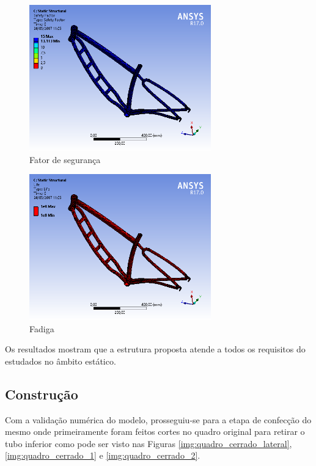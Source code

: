 	\begin{figure}[!htb]
		\centering
		\includegraphics[width=0.7\textwidth]{inter_fator_de_seguranca.png}
		\caption{Fator de segurança}
		\label{img:inter_fator_de_seguranca}
	\end{figure}

	\begin{figure}[!htb]
		\centering
		\includegraphics[width=0.7\textwidth]{inter_fadiga.png}
		\caption{Fadiga}
		\label{img:inter_fadiga}
	\end{figure}
	Os resultados mostram que a estrutura proposta atende a todos os requisitos do estudados no âmbito estático.
	
	\subsection{Construção}
	
	Com a validação numérica do modelo, prosseguiu-se para a etapa de confecção do mesmo onde primeiramente foram feitos cortes no quadro original para retirar o tubo inferior como pode ser visto nas Figuras \ref{img:quadro_cerrado_lateral}, \ref{img:quadro_cerrado_1} e \ref{img:quadro_cerrado_2}.
	
